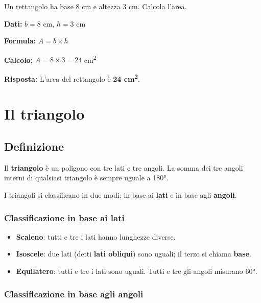 \begin{esempio}
    Un rettangolo ha base 8 cm e altezza 3 cm. Calcola l'area.

    \medskip
    \textbf{Dati:} $b = 8$ cm, $h = 3$ cm

    \textbf{Formula:} $A = b \times h$

    \textbf{Calcolo:} $A = 8 \times 3 = 24$ cm\textsuperscript{2}

    \textbf{Risposta:} L'area del rettangolo è \textbf{24 cm\textsuperscript{2}}.
\end{esempio}

\section{Il triangolo}

\subsection{Definizione}

\begin{definizione}
    Il \textbf{triangolo} è un poligono con tre lati e tre angoli. La somma dei tre angoli interni di qualsiasi triangolo è sempre uguale a 180°.
\end{definizione}

I triangoli si classificano in due modi: in base ai \textbf{lati} e in base agli \textbf{angoli}.

\subsubsection*{Classificazione in base ai lati}

\begin{itemize}[leftmargin=1.5em]
    \item \textbf{Scaleno}: tutti e tre i lati hanno lunghezze diverse.
    \item \textbf{Isoscele}: due lati (detti \textbf{lati obliqui}) sono uguali; il terzo si chiama \textbf{base}.
    \item \textbf{Equilatero}: tutti e tre i lati sono uguali. Tutti e tre gli angoli misurano 60°.
\end{itemize}

\subsubsection*{Classificazione in base agli angoli}

